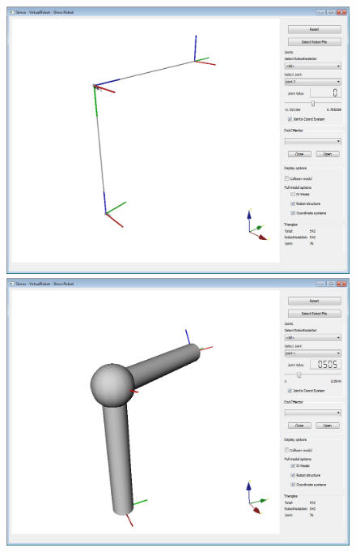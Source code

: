 \begin{figure}[H]
	\centering
	\begin{minipage} {.45\linewidth}
	  \includegraphics[width=\linewidth]{Tutorial5a}
	\end{minipage}
	\begin{minipage} {.45\linewidth}
	  \includegraphics[width=\linewidth]{Tutorial5b}
	\end{minipage}
\end{figure}
\par
